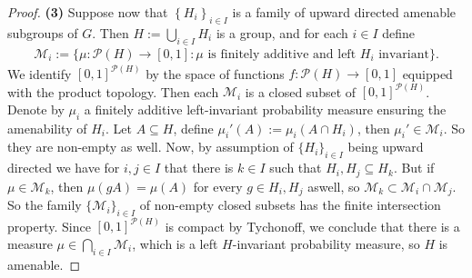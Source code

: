 \begin{proposition}
\begin{proof}
\textbf{(3)} Suppose now that $\left\{H_{i} \right\}_{i \in I}$ is a family of upward directed amenable subgroups of $G$. Then $\displaystyle H:=\bigcup_{i \in I}H_i$ is a group, and for each $i \in I$ define 
\begin{align*} 
\mathcal{M}_{i}:=\{ \mu \colon \mathcal{P}(H) \to [0,1] \colon \mu \text{ is finitely additive and left }H_{i} \text{ invariant}\}.
\end{align*}
We identify $[0,1]^{\mathcal{P}(H)}$ by the space of functions $f \colon \mathcal{P}(H) \to [0,1]$ equipped with the product topology. Then each $\mathcal{M}_{i}$ is a closed subset of $[0,1]^{\mathcal{P}(H)}$. Denote by $\mu_{i}$ a finitely additive left-invariant probability measure ensuring the amenability of $H_{i}$. Let $A \subseteq H$, define $\mu_{i}'(A):=\mu_{i}(A \cap H_{i})$, then $\mu_{i}' \in \mathcal{M}_{i}$. So they are non-empty as well. Now, by assumption of $\{H_i\}_{i \in I}$ being upward directed we have for $i,j \in I$ that there is $k \in I$ such that $H_{i},H_{j} \subseteq H_{k}$. But if $\mu \in \mathcal{M}_{k}$, then $\mu(gA)=\mu(A)$ for every $g \in H_{i},H_{j}$ aswell,	so $\mathcal{M}_{k} \subset \mathcal{M}_{i} \cap \mathcal{M}_{j}$. So the family $\{\mathcal{M}_{i}\}_{i \in I}$ of non-empty closed subsets has the finite intersection property. Since $[0,1]^{\mathcal{P}(H)}$ is compact by Tychonoff, we conclude that there is a measure $\mu \in \bigcap_{i \in I} \mathcal{M}_{i}$, which is a left $H$-invariant probability measure, so $H$ is amenable.
\end{proof}
\end{proposition}


